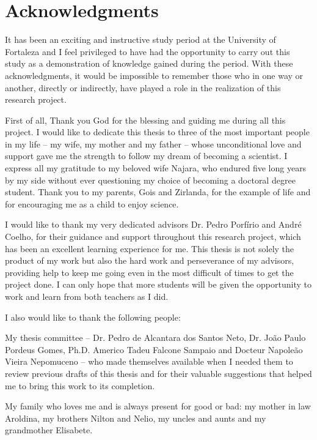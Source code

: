 \chapter*{Acknowledgments} 



It has been an exciting and instructive study period at the University of Fortaleza and I feel privileged to have had the opportunity to carry out this study as a demonstration of
knowledge gained during the period. With these acknowledgments, it would be impossible to remember those who in one way or another, directly or indirectly, have played a role in the realization of this research project. 

First of all, Thank you God for the blessing and guiding me during all this project. I would like to dedicate this thesis to three of the most important people in my life
– my wife, my mother and my father – whose unconditional love and support gave me the
strength to follow my dream of becoming a scientist. I express all my gratitude to my beloved wife Najara, who endured five long years by my side without ever questioning my choice of becoming a doctoral degree student. Thank you to my parents, Gois and Zirlanda,  for the example of life and for encouraging me as a child to enjoy science.

I would like to thank my very dedicated advisors Dr. Pedro Porfírio and André Coelho, for their guidance and support throughout this research project, which has been an excellent
learning experience for me. This thesis is not solely the product of my work but also the hard work and perseverance of my advisors, providing help to keep me going even in the most difficult of times to get the project done. I can only hope that more students will be given the opportunity to work and learn from both teachers as I did.

I also would like to thank the following people:

My thesis committee – Dr. Pedro de Alcantara dos Santos Neto, Dr. João Paulo Pordeus Gomes, Ph.D. Americo Tadeu Falcone Sampaio and Docteur Napoleão Vieira Nepomuceno – who made themselves available when I needed them to review previous drafts of this thesis and for their valuable suggestions that helped me to bring this work to its completion.

My family who loves me and is always present for good or bad: my mother in law Aroldina, my brothers Nilton and Nelio, my uncles and aunts and my grandmother Elisabete.

